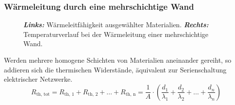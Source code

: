 \subsubsection{Wärmeleitung durch eine mehrschichtige Wand}
\begin{figure}[H]
\centering
\caption{\textbf{\textit{Links:}} Wärmeleitfähigkeit ausgewählter Materialien. \textbf{\textit{Rechts:}} Temperaturverlauf bei der Wärmeleitung einer mehrschichtige Wand.}
\label{fig_Ij}
\end{figure} 
Werden mehrere homogene Schichten von Materialien aneinander gereiht, so addieren sich die thermischen Widerstände, äquivalent zur Serienschaltung elektrischer Netzwerke.
\begin{equation}
\boxed{R_{\text{th, tot}}=R_{\text{th, 1}}+R_{\text{th, 2}}+\dotso+R_{\text{th, n}}=\dfrac{1}{A}\cdot \left(\dfrac{d_1}{\lambda_1}+\dfrac{d_2}{\lambda_2}+\dotso+\dfrac{d_n}{\lambda_n}\right)}
\end{equation}
